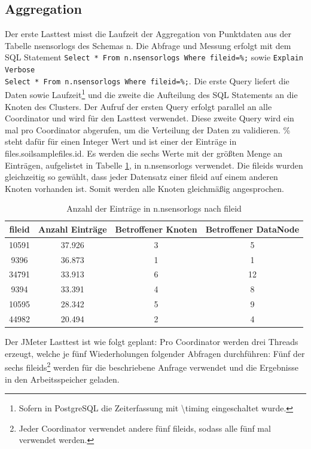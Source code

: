 \subsection{Aggregation}
Der erste Lasttest misst die Laufzeit der Aggregation von Punktdaten aus der Tabelle nsensorlogs des Schemas n.
Die Abfrage und Messung erfolgt mit dem SQL Statement \verb+Select * From n.nsensorlogs Where fileid=%;+ sowie \verb+Explain Verbose+\\
\verb+Select * From n.nsensorlogs Where fileid=%;+.
Die erste Query liefert die Daten sowie Laufzeit\footnote{Sofern in PostgreSQL die Zeiterfassung mit \textbackslash{}timing eingeschaltet wurde.} und die zweite die Aufteilung des SQL Statements an die Knoten des Clusters.
Der Aufruf der ersten Query erfolgt parallel an alle Coordinator und wird für den Lasttest verwendet.
Diese zweite Query wird ein mal pro Coordinator abgerufen, um die Verteilung der Daten zu validieren.
\%{} steht dafür für einen Integer Wert und ist einer der Einträge in files.soilsamplefiles.id.
Es werden die sechs Werte mit der größten Menge an Einträgen, aufgelistet in Tabelle \ref{tbl:entrysnnsensorlogs}, in n.nsensorlogs verwendet.
Die fileids wurden gleichzeitig so gewählt, dass jeder Datensatz einer fileid auf einem anderen Knoten vorhanden ist.
Somit werden alle Knoten gleichmäßig angesprochen.
\begin{table}[h!]
\centering
\begin{tabular}{c|c|c|c}
\textbf{fileid} & \textbf{Anzahl Einträge} & \textbf{Betroffener Knoten} & \textbf{Betroffener DataNode} \\ \hline
10591 & 37.926 & 3 & 5 \\ \hline	%
9396 & 36.873 & 1 & 1 \\ \hline		%
34791 & 33.913 & 6 & 12 \\ \hline 	%
9394 & 33.391 & 4 & 8 \\ \hline 	%
10595 & 28.342 & 5 & 9 \\ \hline	%
44982 & 20.494 & 2 & 4 \\ 			%
\end{tabular}
\caption{Anzahl der Einträge in n.nsensorlogs nach fileid}
\label{tbl:entrysnnsensorlogs}
\end{table}
Der JMeter Lasttest ist wie folgt geplant:
Pro Coordinator werden drei Threads erzeugt, welche je fünf Wiederholungen folgender Abfragen durchführen:
Fünf der sechs fileids\footnote{Jeder Coordinator verwendet andere fünf fileids, sodass alle fünf mal verwendet werden.} werden für die beschriebene Anfrage verwendet und die Ergebnisse in den Arbeitsspeicher geladen.

